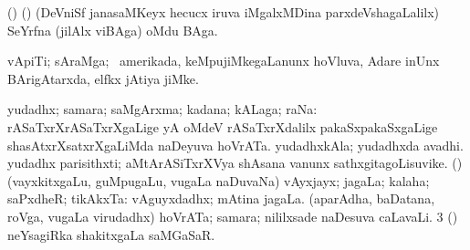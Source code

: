 \bentry
{} 
\gl{\nA}
\expl{}
\bmng
(\birx) (\ca) (DeVniSf janasaMKeyx hecucx iruva iMgalxMDina parxdeVshagaLalilx) SeYrfna (jilAlx viBAga) oMdu BAga. 
\emng
\eentry

\bentry
{} 
\gl{\nA}
\bmng
vApiTi; sAraMga; \kanu\ amerikada, keMpujiMkegaLanunx hoVluva, Adare inUnx BArigAtarxda, elfkx jAtiya jiMke. 
\emng
\eentry

\bentry
{} 
\gl{\nA}
\expl{}
\bmng
\bnum
{} yudadhx; samara; saMgArxma; kadana; kALaga; raNa: 
\banum
{} rASaTxrXrASaTxrXgaLige yA oMdeV rASaTxrXdalilx pakaSxpakaSxgaLige shasAtxrXsatxrXgaLiMda naDeyuva hoVrATa. 
 yudadhxkAla; yudadhxda avadhi. 
 yudadhx parisithxti; aMtArASiTxrXVya shAsana \mo vanunx sathxgitagoLisuvike. 
\eanum
\numie
{} (\rUpa) 
\banum
{} (vayxkitxgaLu, guMpugaLu, \mo vugaLa naDuvaNa) vAyxjayx; jagaLa; kalaha; saPxdheR; tikAkxTa:  vAguyxdadhx; mAtina jagaLa. 
 (aparAdha, baDatana, roVga, \mo vugaLa virudadhx) hoVrATa; samara; nililxsade naDesuva caLavaLi. 
\eanum
\numie
\num{3} (\rUpa) neYsagiRka shakitxgaLa saMGaSaR. 
\enum
\emng


